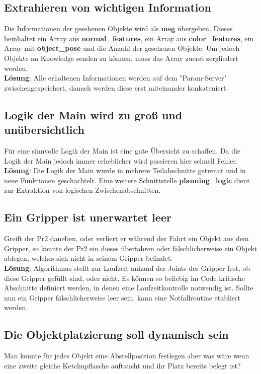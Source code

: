 \documentclass{suturo}
\begin{document}
\subsection{Extrahieren von wichtigen Information}

Die Informationen der gesehenen Objekte wird als \textbf{msg} übergeben. Dieses beinhaltet ein Array aus \textbf{normal\_features}, ein Array aus \textbf{color\_features}, ein Array mit \textbf{object\_pose} und die Anzahl der gesehenen Objekte. 
Um jedoch Objekte an Knowledge senden zu können, muss das Array zuerst zergliedert werden. \\

\textbf{Lösung}: Alle erhaltenen Informationen werden auf dem "Param-Server" zwischengespeichert, danach werden diese erst miteinander konkateniert.

\subsection{Logik der Main wird zu groß und unübersichtlich}
Für eine sinnvolle Logik der Main ist eine gute Übersicht zu schaffen. Da die Logik der Main jedoch immer erheblicher wird passieren hier schnell Fehler.\\

\textbf{Lösung}: Die Logik der Main wurde in mehrere Teilabschnitte getrennt und in neue Funktionen geschachtelt. Eine weitere Schnittstelle \textbf{planning\_logic} dient zur Extraktion von logischen Zwischenabschnitten.


\subsection{Ein Gripper ist unerwartet leer}
Greift der Pr2 daneben, oder verliert er während der Fahrt ein Objekt aus dem Gripper, so könnte der Pr2 ein dieses überfahren oder fälschlicherweise ein Objekt ablegen, welches sich nicht in seinem Gripper befindet.\\

\textbf{Lösung}: Algorithmus stellt zur Laufzeit anhand der Joints des Gripper fest, ob diese Gripper gefüllt sind, oder nicht. Es können so beliebig im Code kritische Abschnitte definiert werden, in denen eine Laufzeitkontrolle notwendig ist. Sollte nun ein Gripper fälschlicherweise leer sein, kann eine Notfallroutine etabliert werden.

\subsection{Die Objektplatzierung soll dynamisch sein}
Man könnte für jedes Objekt eine Abstellposition festlegen aber was wäre wenn eine zweite gleiche Ketchupflasche auftaucht und ihr Platz bereits belegt ist? \\
\end{document}
